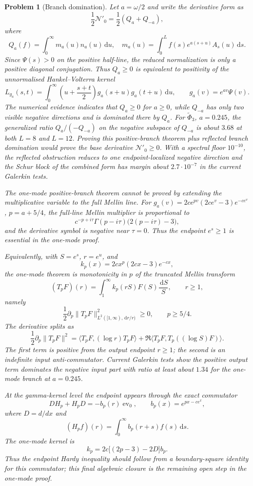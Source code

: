 \documentclass[11pt]{article}
\newtheorem{problem}[theorem]{Problem}
\newcommand{\dd}{\,\mathrm d}
\begin{document}
\begin{problem}[Branch domination]
Let $a=\omega/2$ and write the derivative form as
\[
  \frac12\mathcal N'_0=\frac12(Q_a+Q_{-a}),
\]
where
\[
  Q_a(f)=\int_0^\infty m_a(u)n_a(u)\dd u,
  \quad
  m_a(u)=\int_0^L f(s)e^{a(s+u)}A_s(u)\dd s .
\]
Since $\Psi(s)>0$ on the positive half-line, the reduced normalization is only
a positive diagonal conjugation.  Thus $Q_a\ge0$ is equivalent to positivity of
the unnormalised Hankel--Volterra kernel
\[
  L_{g_a}(s,t)=
  \int_0^\infty
  \left(u+\frac{s+t}{2}\right)g_a(s+u)g_a(t+u)\dd u,
  \qquad
  g_a(v)=e^{av}\Psi(v).
\]
The numerical evidence indicates that $Q_a\ge0$ for $a\ge0$, while $Q_{-a}$
has only two visible negative directions and is dominated there by $Q_a$.
For $\widetilde\Phi_3$, $a=0.245$, the generalized ratio
$Q_a/(-Q_{-a})$ on the negative subspace of $Q_{-a}$ is about $3.68$ at
both $L=8$ and $L=12$.  Proving this positive-branch theorem plus reflected
branch domination would prove the base derivative $\mathcal N'_0\ge0$.
With a spectral floor $10^{-10}$, the reflected obstruction reduces to one
endpoint-localized negative direction and the Schur block of the combined form
has margin about $2.7\cdot10^{-7}$ in the current Galerkin tests.

The one-mode positive-branch theorem cannot be proved by extending the
multiplicative variable to the full Mellin line.  For
$g_a(v)=2c e^{pv}(2ce^v-3)e^{-ce^v}$, $p=a+5/4$, the full-line Mellin
multiplier is proportional to
\[
  c^{-p+i\tau}\Gamma(p-i\tau)\bigl(2(p-i\tau)-3\bigr),
\]
and the derivative symbol is negative near $\tau=0$.  Thus the endpoint
$e^s\ge1$ is essential in the one-mode proof.

Equivalently, with $S=e^s$, $r=e^u$, and
\[
  k_p(x)=2cx^p(2cx-3)e^{-cx},
\]
the one-mode theorem is monotonicity in $p$ of the truncated Mellin transform
\[
  (T_pF)(r)=\int_1^\infty k_p(rS)F(S)\frac{\dd S}{S},
  \qquad r\ge1,
\]
namely
\[
  \frac12\partial_p\|T_pF\|_{L^2([1,\infty),\dd r/r)}^2\ge0,
  \qquad p\ge5/4 .
\]
The derivative splits as
\[
  \frac12\partial_p\|T_pF\|^2
  =
  \langle T_pF,(\log r)T_pF\rangle
  +
  \Re\langle T_pF,T_p((\log S)F)\rangle .
\]
The first term is positive from the output endpoint $r\ge1$; the second is an
indefinite input anti-commutator.  Current Galerkin tests show the positive
output term dominates the negative input part with ratio at least about $1.34$
for the one-mode branch at $a=0.245$.

At the gamma-kernel level the endpoint appears through the exact commutator
\[
  D H_p + H_pD = -b_p(r)\operatorname{ev}_0,
  \qquad
  b_p(x)=e^{px-ce^x},
\]
where $D=d/dx$ and
\[
  (H_pf)(r)=\int_0^\infty b_p(r+s)f(s)\dd s .
\]
The one-mode kernel is
\[
  k_p=2c\bigl[(2p-3)-2D\bigr]b_p.
\]
Thus the endpoint Hardy inequality should follow from a boundary-square
identity for this commutator; this final algebraic closure is the remaining
open step in the one-mode proof.


\end{problem}
\end{document}
